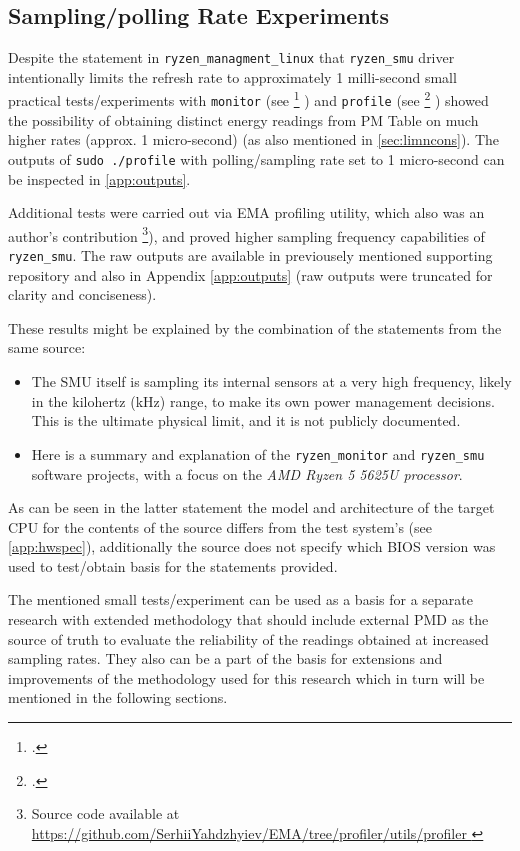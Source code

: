 \subsection{Sampling/polling Rate Experiments}
\label{sec:find:rates}

Despite the statement in \texttt{ryzen\_managment\_linux}
\parencite{ryzen_managment_linux} that
\texttt{ryzen\_smu} driver intentionally limits the refresh rate to
approximately 1 milli-second small practical tests/experiments with
\texttt{monitor} (see \footcite{yahdzhyiev2025repo} )
and \texttt{profile} (see \footcite{yahdzhyiev2025repo}
) showed the possibility of obtaining distinct energy
readings from \gls{PM} Table on much higher rates (approx. 1 micro-second)
(as also mentioned in \cref{sec:limncons}). The outputs of \texttt{sudo
./profile} with polling/sampling rate set to 1 micro-second can be inspected
in \cref{app:outputs}.

Additional tests were carried out via \gls{EMA} profiling utility, which also
was an author's contribution \footnote{
  Source code available at \url{
    https://github.com/SerhiiYahdzhyiev/EMA/tree/profiler/utils/profiler
  }
}), and proved higher sampling frequency capabilities of \texttt{ryzen\_smu}.
The raw outputs are available in previousely mentioned supporting
repository and also in Appendix \cref{app:outputs} (raw outputs were truncated
for clarity and conciseness).

These results might be explained by the combination of the statements from the
same source:

\begin{itemize}
  \item The \gls{SMU} itself is sampling its internal sensors at a very high
    frequency, likely in the kilohertz (kHz) range, to make its own power
    management decisions.
    This is the ultimate physical limit, and it is not publicly documented.
  \item Here is a summary and explanation of the \texttt{ryzen\_monitor} and
    \texttt{ryzen\_smu} software projects, with a focus on the
    \emph{AMD Ryzen 5 5625U processor}.
\end{itemize}
 \parencite{ryzen_managment_linux}

As can be seen in the latter statement the model and architecture of the
target \gls{CPU} for the contents of the source differs from the test system's
(see \cref{app:hwspec}), additionally the source does not specify which
\gls{BIOS} version was used to test/obtain basis for the statements provided.

The mentioned small tests/experiment can be used as a basis for a separate
research with extended methodology that should include external \gls{PMD}
as the source of truth to evaluate the reliability of the readings
obtained at increased sampling rates. They also can be a part of the
basis for extensions and improvements of the methodology used for this
research which in turn will be mentioned in the following sections.
